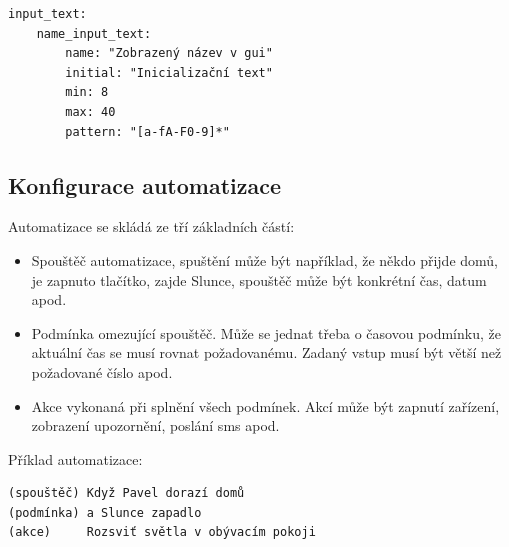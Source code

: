 \begin{lstlisting}
input_text:
	name_input_text:
		name: "Zobrazený název v gui"
		initial: "Inicializační text"
		min: 8
		max: 40
		pattern: "[a-fA-F0-9]*"
\end{lstlisting}

\subsection{Konfigurace automatizace}

Automatizace se skládá ze tří základních částí:

\begin{itemize}
\item Spouštěč automatizace, spuštění může být například, že někdo přijde
domů, je zapnuto tlačítko, zajde Slunce, spouštěč může být konkrétní
čas, datum apod.
\item Podmínka omezující spouštěč. Může se jednat třeba o časovou podmínku, že aktuální čas se musí rovnat požadovanému. Zadaný vstup musí
být větší než požadované číslo apod.
\item Akce vykonaná při splnění všech podmínek. Akcí může být zapnutí
zařízení, zobrazení upozornění, poslání sms apod.
\end{itemize}

Příklad automatizace:

\begin{lstlisting}
(spouštěč) Když Pavel dorazí domů
(podmínka) a Slunce zapadlo
(akce) 	   Rozsviť světla v obývacím pokoji
\end{lstlisting}


